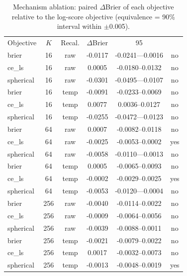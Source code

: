 \begin{table}[!t]
\caption{Mechanism ablation: paired $\Delta$Brier of each objective relative to the log-score objective (equivalence = 90\% interval within $\pm$0.005).}
\label{tab:mechanism}
\centering
\footnotesize
\begin{tabular}{lccccc}
\hline
Objective & $K$ & Recal. & $\Delta$Brier & 95\\%
brier & 16 & raw & -0.0117 & -0.0241---0.0016 & no \\
ce\_ls & 16 & raw & 0.0005 & -0.0180--0.0132 & no \\
spherical & 16 & raw & -0.0301 & -0.0495---0.0107 & no \\
brier & 16 & temp & -0.0091 & -0.0233--0.0069 & no \\
ce\_ls & 16 & temp & 0.0077 & 0.0036--0.0127 & no \\
spherical & 16 & temp & -0.0255 & -0.0472---0.0123 & no \\
brier & 64 & raw & 0.0007 & -0.0082--0.0118 & no \\
ce\_ls & 64 & raw & -0.0025 & -0.0053--0.0002 & yes \\
spherical & 64 & raw & -0.0058 & -0.0110---0.0013 & no \\
brier & 64 & temp & 0.0005 & -0.0065--0.0093 & no \\
ce\_ls & 64 & temp & -0.0002 & -0.0029--0.0025 & yes \\
spherical & 64 & temp & -0.0053 & -0.0120---0.0004 & no \\
brier & 256 & raw & -0.0040 & -0.0114--0.0022 & no \\
ce\_ls & 256 & raw & -0.0009 & -0.0064--0.0056 & no \\
spherical & 256 & raw & -0.0039 & -0.0088--0.0011 & no \\
brier & 256 & temp & -0.0021 & -0.0079--0.0022 & no \\
ce\_ls & 256 & temp & 0.0017 & -0.0032--0.0073 & no \\
spherical & 256 & temp & -0.0013 & -0.0048--0.0019 & yes \\
\hline
\end{tabular}
\end{table}